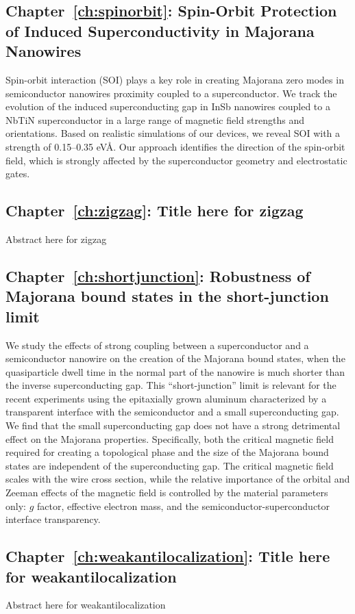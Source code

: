 \subsection{Chapter~\ref{ch:spinorbit}: Spin-Orbit Protection of Induced Superconductivity in Majorana Nanowires}
Spin-orbit interaction (SOI) plays a key role in creating Majorana zero modes in semiconductor nanowires proximity coupled to a superconductor.
We track the evolution of the induced superconducting gap in InSb nanowires coupled to a NbTiN superconductor in a large range of magnetic field strengths and orientations.
Based on realistic simulations of our devices, we reveal SOI with a strength of 0.15--0.35 eV\AA.
Our approach identifies the direction of the spin-orbit field, which is strongly affected by the superconductor geometry and electrostatic gates.
\vspace{1mm}

\subsection{Chapter~\ref{ch:zigzag}: Title here for zigzag}
Abstract here for zigzag
\vspace{1mm}

\subsection{Chapter~\ref{ch:shortjunction}: Robustness of Majorana bound states in the short-junction limit}
We study the effects of strong coupling between a superconductor and a semiconductor nanowire on the creation of the Majorana bound states, when the quasiparticle dwell time in the normal part of the nanowire is much shorter than the inverse superconducting gap.
This ``short-junction'' limit is relevant for the recent experiments using the epitaxially grown aluminum characterized by a transparent interface with the semiconductor and a small superconducting gap.
We find that the small superconducting gap does not have a strong detrimental effect on the Majorana properties.
Specifically, both the critical magnetic field required for creating a topological phase and the size of the Majorana bound states are independent of the superconducting gap.
The critical magnetic field scales with the wire cross section, while the relative importance of the orbital and Zeeman effects of the magnetic field is controlled by the material parameters only: $g$ factor, effective electron mass, and the semiconductor-superconductor interface transparency.

\subsection{Chapter~\ref{ch:weakantilocalization}: Title here for weakantilocalization}
Abstract here for weakantilocalization
\vspace{1mm}


